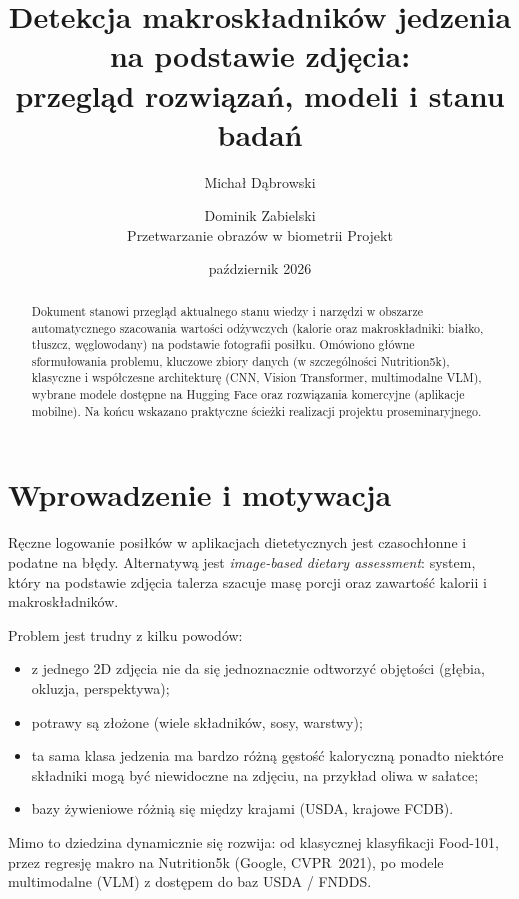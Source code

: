 \documentclass[11pt,a4paper]{article}
\title{%
  Detekcja makroskładników jedzenia na podstawie zdjęcia:\\
  przegląd rozwiązań, modeli i stanu badań%
}
\author{%
  Michał Dąbrowski \and Dominik Zabielski\\[0.4em]
  \normalsize Przetwarzanie obrazów w biometrii Projekt%
}
\date{październik 2026}
\begin{document}
\maketitle

\begin{abstract}
Dokument stanowi przegląd aktualnego stanu wiedzy i narzędzi w obszarze
automatycznego szacowania wartości odżywczych (kalorie oraz makroskładniki:
białko, tłuszcz, węglowodany) na podstawie fotografii posiłku.
Omówiono główne sformułowania problemu, kluczowe zbiory danych
(w szczególności Nutrition5k), klasyczne i współczesne architekturę
(CNN, Vision Transformer, multimodalne VLM), wybrane modele dostępne na
Hugging Face oraz rozwiązania komercyjne (aplikacje mobilne).
Na końcu wskazano praktyczne ścieżki realizacji projektu proseminaryjnego.
\end{abstract}

\tableofcontents
\newpage

\section{Wprowadzenie i motywacja}

Ręczne logowanie posiłków w aplikacjach dietetycznych jest czasochłonne
i podatne na błędy. Alternatywą jest \emph{image-based dietary assessment}:
system, który na podstawie zdjęcia talerza szacuje masę porcji oraz
zawartość kalorii i makroskładników.

Problem jest trudny z kilku powodów:
\begin{itemize}[leftmargin=*]
  \item z jednego 2D zdjęcia nie da się jednoznacznie odtworzyć objętości
        (głębia, okluzja, perspektywa);
  \item potrawy są złożone (wiele składników, sosy, warstwy);
  \item ta sama klasa jedzenia ma bardzo różną gęstość kaloryczną
        ponadto niektóre składniki mogą być niewidoczne na zdjęciu, na przykład
        oliwa w sałatce;
  \item bazy żywieniowe różnią się między krajami (USDA, krajowe FCDB).
\end{itemize}

Mimo to dziedzina dynamicznie się rozwija: od klasycznej klasyfikacji
Food-101, przez regresję makro na Nutrition5k (Google, CVPR~2021),
po modele multimodalne (VLM) z dostępem do baz USDA / FNDDS.
\end{document}
